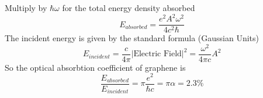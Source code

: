 \documentclass[a4paper,12pt]{article}
\begin{document}
Multiply by $\hbar \omega$ for the total energy density absorbed
\begin{equation}
E_{absorbed}=\frac{e^2 A^2 \omega^2}{4 c^2 \hbar}
\end{equation}
The incident energy is given by the standard formula (Gaussian Units)
\begin{equation}
E_{incident}=\frac{c}{4 \pi}|\text{Electric Field}|^2=\frac{\omega^2}{4 \pi c} A^2
\end{equation}
So the optical absorbtion coefficient of graphene is
\begin{equation}
\frac{E_{absorbed}}{E_{incident}}= \pi \frac{e^2}{\hbar c} = \pi \alpha = 2.3\%
\end{equation}
\end{document}
